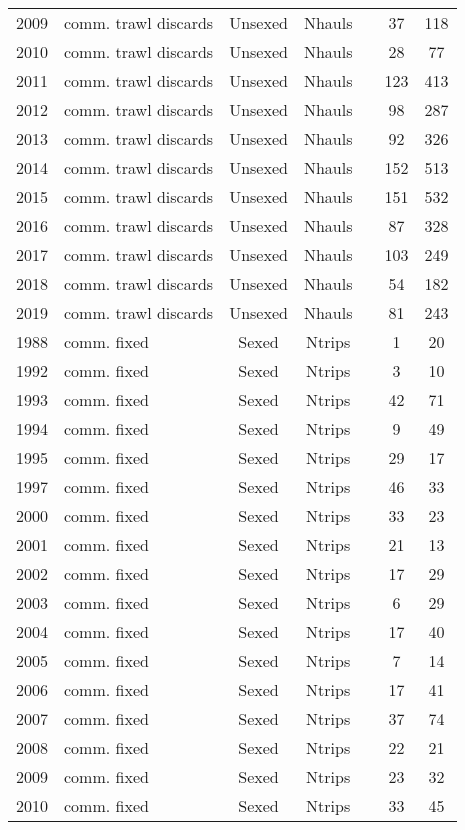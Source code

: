 \begin{longtable}[t]{c>{\centering\arraybackslash}p{3cm}ccccc}
2009 & comm. trawl discards & Unsexed & Nhauls &  & 37 & 118\\
2010 & comm. trawl discards & Unsexed & Nhauls &  & 28 & 77\\
2011 & comm. trawl discards & Unsexed & Nhauls &  & 123 & 413\\
2012 & comm. trawl discards & Unsexed & Nhauls &  & 98 & 287\\
2013 & comm. trawl discards & Unsexed & Nhauls &  & 92 & 326\\
2014 & comm. trawl discards & Unsexed & Nhauls &  & 152 & 513\\
2015 & comm. trawl discards & Unsexed & Nhauls &  & 151 & 532\\
2016 & comm. trawl discards & Unsexed & Nhauls &  & 87 & 328\\
2017 & comm. trawl discards & Unsexed & Nhauls &  & 103 & 249\\
2018 & comm. trawl discards & Unsexed & Nhauls &  & 54 & 182\\
2019 & comm. trawl discards & Unsexed & Nhauls &  & 81 & 243\\
1988 & comm. fixed & Sexed & Ntrips &  & 1 & 20\\
1992 & comm. fixed & Sexed & Ntrips &  & 3 & 10\\
1993 & comm. fixed & Sexed & Ntrips &  & 42 & 71\\
1994 & comm. fixed & Sexed & Ntrips &  & 9 & 49\\
1995 & comm. fixed & Sexed & Ntrips &  & 29 & 17\\
1997 & comm. fixed & Sexed & Ntrips &  & 46 & 33\\
2000 & comm. fixed & Sexed & Ntrips &  & 33 & 23\\
2001 & comm. fixed & Sexed & Ntrips &  & 21 & 13\\
2002 & comm. fixed & Sexed & Ntrips &  & 17 & 29\\
2003 & comm. fixed & Sexed & Ntrips &  & 6 & 29\\
2004 & comm. fixed & Sexed & Ntrips &  & 17 & 40\\
2005 & comm. fixed & Sexed & Ntrips &  & 7 & 14\\
2006 & comm. fixed & Sexed & Ntrips &  & 17 & 41\\
2007 & comm. fixed & Sexed & Ntrips &  & 37 & 74\\
2008 & comm. fixed & Sexed & Ntrips &  & 22 & 21\\
2009 & comm. fixed & Sexed & Ntrips &  & 23 & 32\\
2010 & comm. fixed & Sexed & Ntrips &  & 33 & 45\\

\end{longtable}
